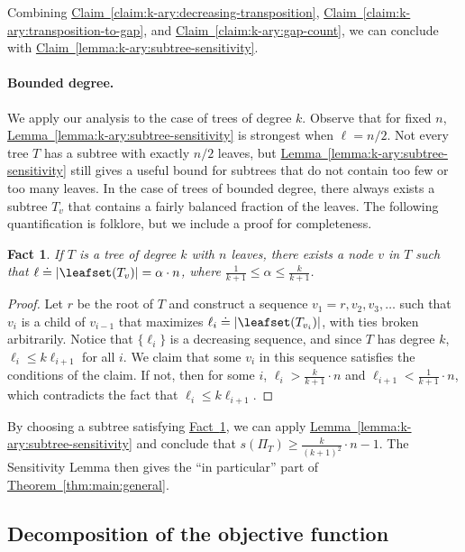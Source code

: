 \documentclass[11pt]{article}
\numberwithin{equation}{section}
\newtheorem{fact}[theorem]{Fact}
\theoremstyle{definition}
\theoremstyle{plain}
\newcommand{\expref}[2]{\hyperref[#2]{#1~\ref{#2}}}
\begin{document}
Combining \expref{Claim}{claim:k-ary:decreasing-transposition}, \expref{Claim}{claim:k-ary:transposition-to-gap}, and \expref{Claim}{claim:k-ary:gap-count}, we can conclude with \expref{Claim}{lemma:k-ary:subtree-sensitivity}.

\paragraph{Bounded degree.}
We apply our analysis to the case of trees of degree $k$. Observe that for fixed $n$, \expref{Lemma}{lemma:k-ary:subtree-sensitivity} is strongest when $\ell=n/2$. Not every tree $T$ has a subtree with exactly $n/2$ leaves, but \expref{Lemma}{lemma:k-ary:subtree-sensitivity} still gives a useful bound for subtrees that do not contain too few or too many leaves. In the case of trees of bounded degree, there always exists a subtree $T_v$ that contains a fairly balanced fraction of the leaves. The following quantification is folklore, but we include a proof for completeness.
 
\begin{fact}
    \label{fact:k-ary:balance}
    If $T$ is a tree of degree $k$ with $n$ leaves, there exists a node $v$ in $T$ such that $\ell \doteq \lvert\leafset(T_v)\rvert = \alpha 
    \cdot n$, where $\frac{1}{k+1} \le \alpha \le \frac{k}{k+1}$.
\end{fact}

\begin{proof}
    Let $r$ be the root of $T$ and construct a sequence $v_1=r,v_2,v_3,\dots$ such that $v_{i}$ is a child of $v_{i-1}$ that maximizes $\ell_{i} \doteq \lvert\leafset(T_{v_{i}})\rvert$, with ties broken arbitrarily. Notice that $\{\ell_i\}$ is a decreasing sequence, and since $T$ has degree $k$, $\ell_{i} \le k\ell_{i+1}$ for all $i$. We claim that some $v_i$ in this sequence satisfies the conditions of the claim. If not, then for some $i$, $\ell_i> \frac{k}{k+1}\cdot n$ and $\ell_{i+1}< \frac{1}{k+1}\cdot n$, which contradicts the fact that $\ell_i\le k\ell_{i+1}$.
\end{proof}

By choosing a subtree satisfying \expref{Fact}{fact:k-ary:balance}, we can apply \expref{Lemma}{lemma:k-ary:subtree-sensitivity} and conclude that $s(\Pi_T)\ge \frac{k}{(k+1)^2} \cdot n -1$. The Sensitivity Lemma then gives the ``in particular'' part of \expref{Theorem}{thm:main:general}.

\subsection{Decomposition of the objective function}
\label{sec:decomposition}
\end{document}
